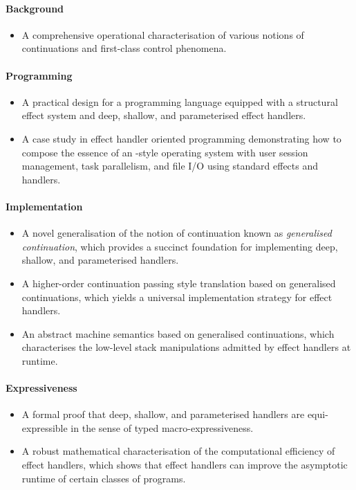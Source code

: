 \documentclass[12pt,phd,lfcs,twoside,openright,logo,leftchapter,normalheadings]{infthesis}
\theoremstyle{plain}
\theoremstyle{definition}
\begin{document}
\paragraph{Background}
\begin{itemize}
  \item A comprehensive operational characterisation of various
    notions of continuations and first-class control phenomena.
\end{itemize}
\paragraph{Programming}
\begin{itemize}
  \item A practical design for a programming language equipped with a
    structural effect system and deep, shallow, and parameterised effect
    handlers.
  \item A case study in effect handler oriented programming
    demonstrating how to compose the essence of an \UNIX{}-style
    operating system with user session management, task parallelism,
    and file I/O using standard effects and handlers.
\end{itemize}

\paragraph{Implementation}
\begin{itemize}
  \item A novel generalisation of the notion of continuation known as
    \emph{generalised continuation}, which provides a succinct
    foundation for implementing deep, shallow, and parameterised
    handlers.
  \item A higher-order continuation passing style translation based on
    generalised continuations, which yields a universal implementation
    strategy for effect handlers.
  \item An abstract machine semantics based on generalised
    continuations, which characterises the low-level stack
    manipulations admitted by effect handlers at runtime.
\end{itemize}
\paragraph{Expressiveness}
\begin{itemize}
  \item A formal proof that deep, shallow, and parameterised handlers
    are equi-expressible in the sense of typed macro-expressiveness.
  \item A robust mathematical characterisation of the computational
    efficiency of effect handlers, which shows that effect handlers
    can improve the asymptotic runtime of certain classes of programs.
\end{itemize}
\end{document}
